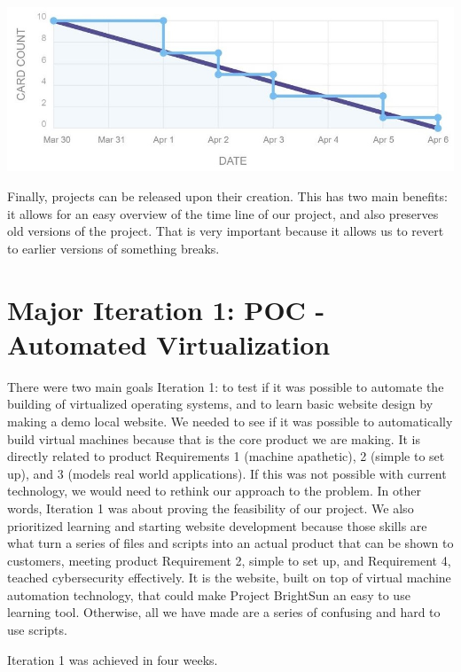 \documentclass[openright]{report}
\begin{document}
\begin{center}
    \includegraphics[scale=0.54]{images/throughput.jpg}
\end{center}

\par Finally, projects can be released upon their creation. This has two main benefits: it allows for an easy overview of the time line of our project, and also preserves old versions of the project. That is very important because it allows us to revert to earlier versions of something breaks.

\section{Major Iteration 1: POC - Automated Virtualization}
\par There were two main goals Iteration 1: to test if it was possible to automate the building of virtualized operating systems, and to learn basic website design by making a demo local website. We needed to see if it was possible to automatically build virtual machines because that is the core product we are making. It is directly related to product Requirements 1 (machine apathetic), 2 (simple to set up), and 3 (models real world applications). If this was not possible with current technology, we would need to rethink our approach to the problem. In other words, Iteration 1 was about proving the feasibility of our project. We also prioritized learning and starting website development because those skills are what turn a series of files and scripts into an actual product that can be shown to customers, meeting product Requirement 2, simple to set up, and Requirement 4, teached cybersecurity effectively. It is the website, built on top of virtual machine automation technology, that could make Project BrightSun an easy to use learning tool. Otherwise, all we have made are a series of confusing and hard to use scripts. 
\par Iteration 1 was achieved in four weeks.
\end{document}
